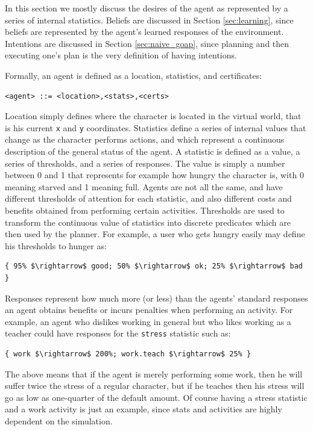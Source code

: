 In this section we mostly discuss the desires of the agent as represented by a series of internal statistics. Beliefs are discussed in Section \ref{sec:learning}, since beliefs are represented by the agent's learned responses of the environment. Intentions are discussed in Section \ref{sec:naive_goap}, since planning and then executing one's plan is the very definition of having intentions.

Formally, an agent is defined as a location, statistics, and certificates:

\begin{lstlisting}
<agent> ::= <location>,<stats>,<certs>
\end{lstlisting}

Location simply defines where the character is located in the virtual world, that is his current \texttt{x} and \texttt{y} coordinates. Statistics define a series of internal values that change as the character performs actions, and which represent a continuous description of the general status of the agent. A statistic is defined as a value, a series of thresholds, and a series of responses. The value is simply a number between 0 and 1 that represents for example how hungry the character is, with 0 meaning starved and 1 meaning full. Agents are not all the same, and have different thresholds of attention for each statistic, and also different costs and benefits obtained from performing certain activities. Thresholds are used to transform the continuous value of statistics into discrete predicates which are then used by the planner. For example, a user who gets hungry easily may define his thresholds to hunger as:

\begin{lstlisting}
{ 95% $\rightarrow$ good; 50% $\rightarrow$ ok; 25% $\rightarrow$ bad }
\end{lstlisting}

Responses represent how much more (or less) than the agents' standard responses an agent obtains benefits or incurs penalties when performing an activity. For example, an agent who dislikes working in general but who likes working as a teacher could have responses for the \texttt{stress} statistic such as:

\begin{lstlisting}
{ work $\rightarrow$ 200%; work.teach $\rightarrow$ 25% }
\end{lstlisting}

The above means that if the agent is merely performing some work, then he will suffer twice the stress of a regular character, but if he teaches then his stress will go as low as one-quarter of the default amount. Of course having a stress statistic and a work activity is just an example, since stats and activities are highly dependent on the simulation. 


